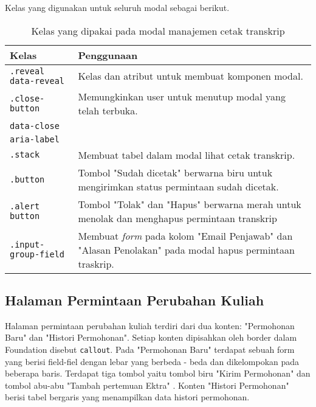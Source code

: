 \noindent Kelas yang digunakan untuk seluruh modal sebagai berikut.

\begin{table}[H]
	\centering
	\begin{tabularx}{\textwidth}{lX}
		\toprule
		Kelas     & Penggunaan \\
		\midrule
		\texttt{.reveal data-reveal} & Kelas dan atribut untuk membuat komponen modal.\\
		\texttt{.close-button}  & Memungkinkan user untuk menutup modal yang telah terbuka.\\
		\texttt{data-close} & \\
		\texttt{aria-label} & \\
		\texttt{.stack} & Membuat tabel dalam modal lihat cetak transkrip.\\
		\texttt{.button} & Tombol "Sudah dicetak" berwarna biru untuk mengirimkan status permintaan sudah dicetak. \\
		\texttt{.alert button} & Tombol "Tolak" dan "Hapus" berwarna merah untuk menolak dan menghapus permintaan transkrip\\
		\texttt{.input-group-field} & Membuat  \textit{form} pada kolom "Email Penjawab" dan "Alasan Penolakan" pada modal hapus permintaan traskrip.\\
		\bottomrule
	\end{tabularx}%
	\caption{Kelas yang dipakai pada modal manajemen cetak transkrip}
\end{table}%

\subsection{Halaman Permintaan Perubahan Kuliah}
Halaman permintaan perubahan kuliah terdiri dari dua konten: "Permohonan Baru" dan "Histori Permohonan". Setiap konten dipisahkan oleh border dalam Foundation disebut \texttt{callout}. Pada "Permohonan Baru" terdapat sebuah form yang berisi field-fiel dengan lebar yang berbeda - beda dan dikelompokan pada beberapa baris. Terdapat tiga tombol yaitu tombol biru "Kirim Permohonan" dan tombol abu-abu "Tambah pertemuan Ektra" .
Konten "Histori Permohonan" berisi tabel bergaris yang menampilkan data histori permohonan. 

